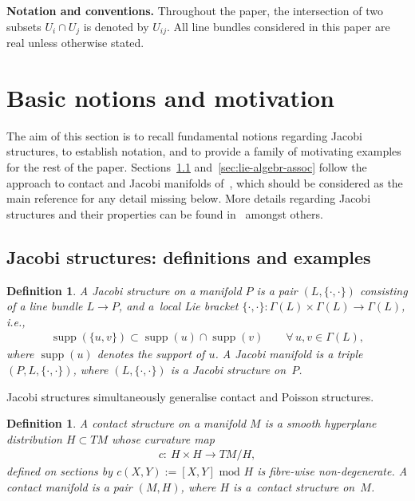 \documentclass[pdftex]{sigma}
\numberwithin{equation}{section}
\newtheorem{Definition}[Theorem]{Definition}
\begin{document}
{\bf Notation and conventions.} Throughout the paper, the intersection of two subsets $U_i \cap U_j$ is denoted by $U_{ij}$. All line bundles considered in this paper are real unless otherwise stated.

\section{Basic notions and motivation} \label{sec:motiv-mult-free}
The aim of this section is to recall fundamental notions regarding Jacobi structures, to establish notation, and to provide a family of motivating examples for the rest of the paper. Sections~\ref{sec:basic-notions} and~\ref{sec:lie-algebr-assoc} follow the approach to contact and Jacobi manifolds of~\cite{Maria-Crainic}, which should be considered as the main reference for any detail missing below. More details regarding Jacobi structures and their properties can be found in~\cite{jacobi,Dazord-Lich-Marle91,Lichnerowicz,Kirillov} amongst others.

\subsection{Jacobi structures: def\/initions and examples}\label{sec:basic-notions}
\begin{Definition}\label{defn:jacobi_structure} A {\it Jacobi structure} on a manifold $P$ is a pair $(L,\{\cdot,\cdot\})$ consisting of a line bundle $L\to P$, and a~{\em local} Lie bracket $\{\cdot,\cdot\} \colon \Gamma(L) \times \Gamma(L) \to \Gamma(L)$, i.e.,
\begin{gather*}
 \operatorname{supp}(\{u,v\})\subset \operatorname{supp}(u)\cap \operatorname{supp} (v)\qquad \forall \, u,v\in\Gamma(L),
\end{gather*}
where $\operatorname{supp}(u)$ denotes the support of $u$. A {\it Jacobi manifold} is a triple $(P,L,\{\cdot,\cdot\})$, where $(L,\{\cdot,\cdot\})$ is a Jacobi structure on~$P$.
\end{Definition}

Jacobi structures simultaneously generalise contact and Poisson structures.

\begin{Definition}\label{defn:contact_structure} A {\it contact structure} on a manifold $M$ is a smooth hyperplane distribution $H\subset TM$ whose curvature map
 \begin{gather}\label{curvature}
 c\colon \ H\times H\to T M/H,
 \end{gather}
def\/ined on sections by $c(X,Y):=[X,Y] \text{ mod } H$ is f\/ibre-wise non-degenerate. A {\it contact manifold} is a pair $(M,H)$, where $H$ is a~contact structure on~$M$.
\end{Definition}
\end{document}
